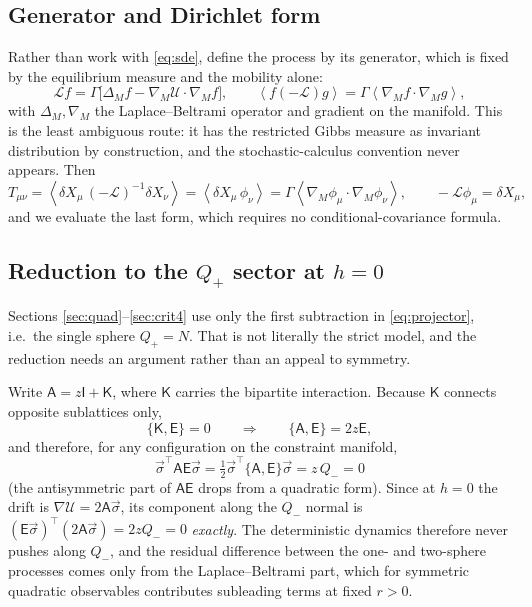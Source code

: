 \documentclass[11pt,a4paper]{article}
\newcommand{\avg}[1]{\left\langle #1 \right\rangle}
\newcommand{\Uc}{\mathscr{U}}          %
\newcommand{\Lc}{\mathcal{L}}
\newcommand{\Em}{\mathsf{E}}
\newcommand{\Tm}{T}
\newcommand{\bs}{\vec\sigma}
\newcommand{\avg}[1]{\left\langle #1 \right\rangle}
\begin{document}
\subsection{Generator and Dirichlet form}
\label{sec:generator}
Rather than work with \eqref{eq:sde}, define the process by its generator, which is fixed by
the equilibrium measure and the mobility alone:
\begin{equation}
  \Lc f=\Gamma\Big[\Delta_M f-\nabla_M\Uc\cdot\nabla_M f\Big],
  \qquad
  \avg{f(-\Lc)g}=\Gamma\avg{\nabla_M f\cdot\nabla_M g},
  \label{eq:dirichlet}
\end{equation}
with $\Delta_M,\nabla_M$ the Laplace--Beltrami operator and gradient on the manifold. This
is the least ambiguous route: it has the restricted Gibbs measure as invariant distribution
by construction, and the stochastic-calculus convention never appears. Then
\begin{equation}
  \Tm_{\mu\nu}=\avg{\delta X_\mu\,(-\Lc)^{-1}\delta X_\nu}
   =\avg{\delta X_\mu\,\phi_\nu}
   =\Gamma\avg{\nabla_M\phi_\mu\cdot\nabla_M\phi_\nu},
  \qquad -\Lc\phi_\mu=\delta X_\mu ,
  \label{eq:twoforms}
\end{equation}
and we evaluate the last form, which requires no conditional-covariance formula.

\subsection{Reduction to the $Q_+$ sector at $h=0$}
\label{sec:reduction}
Sections \ref{sec:quad}--\ref{sec:crit4} use only the first subtraction in
\eqref{eq:projector}, i.e.\ the single sphere $Q_+=N$. That is not literally the strict
model, and the reduction needs an argument rather than an appeal to symmetry.

Write $\mathsf A=z\mathsf I+\mathsf K$, where $\mathsf K$ carries the bipartite interaction.
Because $\mathsf K$ connects opposite sublattices only,
\begin{equation}
  \{\mathsf K,\Em\}=0
  \qquad\Longrightarrow\qquad
  \{\mathsf A,\Em\}=2z\Em ,
\end{equation}
and therefore, for any configuration on the constraint manifold,
\begin{equation}
  \boxed{\ \bs^\top\mathsf A\Em\bs=\tfrac12\bs^\top\{\mathsf A,\Em\}\bs=z\,Q_-=0\ }
  \label{eq:anticomm}
\end{equation}
(the antisymmetric part of $\mathsf A\Em$ drops from a quadratic form). Since at $h=0$ the
drift is $\nabla\Uc=2\mathsf A\bs$, its component along the $Q_-$ normal is
$(\Em\bs)^\top(2\mathsf A\bs)=2zQ_-=0$ \emph{exactly}. The deterministic dynamics therefore
never pushes along $Q_-$, and the residual difference between the one- and two-sphere
processes comes only from the Laplace--Beltrami part, which for symmetric quadratic
observables contributes subleading terms at fixed $r>0$.
\end{document}
